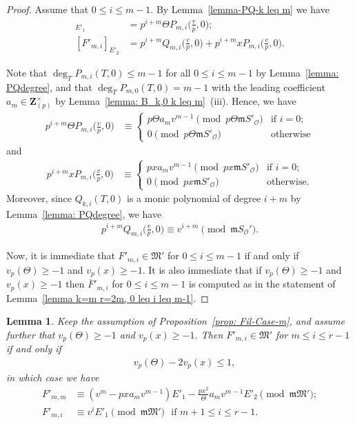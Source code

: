 \documentclass[11pt]{amsart}
\theoremstyle{definition}
\numberwithin{equation}{subsection}
\theoremstyle{plain}
\theoremstyle{plain}
\theoremstyle{plain}
\theoremstyle{plain}
\theoremstyle{plain}
\theoremstyle{plain}
\theoremstyle{plain}
\theoremstyle{plain}
\theoremstyle{plain}
\newtheorem{lemm}[equation]{Lemma}
\theoremstyle{plain}
\theoremstyle{plain}
\theoremstyle{plain}
\theoremstyle{definition}
\theoremstyle{definition}
\theoremstyle{definition}
\theoremstyle{remark}
\renewcommand{\(}{\textup{(}}
\renewcommand{\)}{\textup{)}}
\newcommand{\Z}{\mathbf{Z}}
\newcommand{\fM}{\mathfrak{M}}
\newcommand{\fm}{\mathfrak{m}}
\newcommand{\cO}{\mathcal{O}}
\newcommand{\barF}{\overline{F}}
\begin{document}
\begin{proof}
Assume that $0\leq i\leq m-1$. By Lemma~\ref{lemma-PQ-k leq m} we have
\begin{align*}
[F'_{m,i}]_{E'_1} &=p^{i+m}\Theta P_{m,i}\Big(\frac{v}{p},0\Big);\\
[F'_{m,i}]_{E'_2} &=p^{i+m}Q_{m,i}\Big(\frac{v}{p},0\Big) +p^{i+m}xP_{m,i}\Big(\frac{v}{p},0\Big).
\end{align*}

Note that $\deg_T P_{m,i}(T,0)\leq m-1$ for all $0\leq i\leq m-1$ by Lemma~\ref{lemma: PQdegree}, and that $\deg_TP_{m,0}(T,0)=m-1$ with the leading coefficient $a_m\in\Z_{(p)}^\times$ by Lemma~\ref{lemma: B_k,0 k leq m}~(iii). Hence, we have
\begin{align*}
    p^{i+m}\Theta P_{m,i}\Big(\frac{v}{p},0\Big) &\equiv
    \begin{cases}
        p\Theta a_m v^{m-1}\pmod{p\Theta\fm S'_\cO} & \mbox{if } i=0; \\
        0\pmod{p\Theta\fm S'_\cO} & \mbox{otherwise}
    \end{cases}
\end{align*}
and
\begin{align*}
    p^{i+m}xP_{m,i}\Big(\frac{v}{p},0\Big) &\equiv
    \begin{cases}
        pxa_mv^{m-1}\pmod{px\fm S'_\cO} & \mbox{if } i=0; \\
        0 \pmod{px\fm S'_\cO} & \mbox{otherwise}.
    \end{cases}
\end{align*}
Moreover, since $Q_{k,i}(T,0)$ is a monic polynomial of degree $i+m$ by Lemma~\ref{lemma: PQdegree}, we have
\begin{align*}
    p^{i+m}Q_{m,i}\Big(\frac{v}{p},0\Big) \equiv v^{i+m} \pmod{\fm S_\cO'}.
\end{align*}

Now, it is immediate that $F'_{m,i}\in\fM'$ for $0\leq i\leq m-1$ if and only if $v_p(\Theta)\geq -1$ and $v_p(x)\geq -1$. It is also immediate that if $v_p(\Theta)\geq -1$ and $v_p(x)\geq -1$ then $\barF'_{m,i}$ for $0\leq i\leq m-1$ is computed as in the statement of Lemma~\ref{lemma k=m r=2m, 0 leq i leq m-1}.
\end{proof}





\begin{lemm}\label{lemma k=m r=2m, m leq i leq r-1}
Keep the assumption of Proposition~\ref{prop: Fil-Case-m}, and assume further that $v_p(\Theta)\geq -1$ and $v_p(x)\geq -1$. Then $F'_{m,i}\in\fM'$ for $m\leq i\leq r-1$ if and only if
\begin{align*}
   \quad v_p(\Theta)-2v_p(x)\leq 1,
\end{align*}
in which case we have
\begin{align*}
F'_{m,m} &\equiv (v^m-pxa_mv^{m-1})E'_1-\frac{px^2}{\Theta}a_mv^{m-1}E'_2 \pmod{\fm\fM'} ;\\
F'_{m,i} &\equiv v^iE'_1\pmod{\fm\fM'} \,\,\mbox{ if }m+1\leq i\leq r-1.
\end{align*}
\end{lemm}
\end{document}
